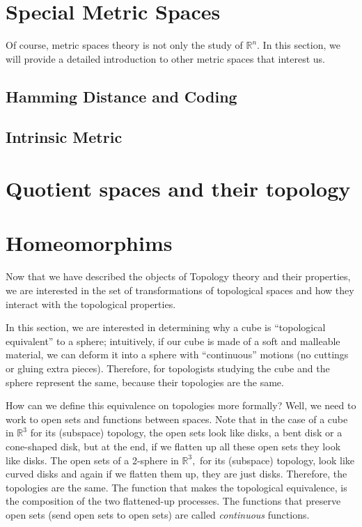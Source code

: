 \documentclass[
	fontsize=10pt, %
	twoside=false, %
	secnumdepth=1, %
]{kaobook}
\begin{document}
\section{Special Metric Spaces}

Of course, metric spaces theory is not only the study of $\mathbb{R}^n.$ In this section, we will provide a detailed introduction to other metric spaces that interest us.

\subsection{Hamming Distance and Coding}


\subsection{Intrinsic Metric}


\section{Quotient spaces and their topology}


\section{Homeomorphims}

Now that we have described the objects of Topology theory and their properties, we are interested in the set of transformations of topological spaces and how they interact with the topological properties.

In this section, we are interested in determining why a cube is ``topological equivalent'' to a sphere; intuitively, if our cube is made of a soft and malleable material, we can deform it into a sphere with ``continuous'' motions (no cuttings or gluing extra pieces). Therefore, for topologists studying the cube and the sphere represent the same, because their topologies are the same. 

How can we define this equivalence on topologies more formally? Well, we need to work to open sets and functions between spaces. Note that in the case of a cube in $\mathbb{R}^3$ for its (subspace) topology, the open sets look like disks, a bent disk or a cone-shaped disk, but at the end, if we flatten up all these open sets they look like disks. The open sets of a 2-sphere in $\mathbb{R}^3,$ for its (subspace) topology, look like curved disks and again if we flatten them up, they are just disks. Therefore, the topologies are the same. The function that makes the topological equivalence, is the composition of the two flattened-up processes. The functions that preserve open sets (send open sets to open sets) are called \emph{continuous} functions. 
\end{document}
